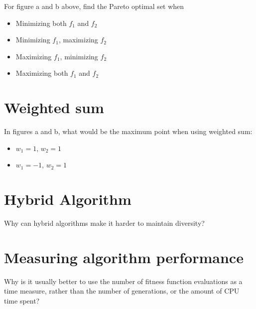 For figure a and b above, find the Pareto optimal set when
\begin{itemize}
    \item Minimizing both \(f_1\) and \(f_2\)
    \item Minimizing \(f_1\), maximizing \(f_2\)
    \item Maximizing \(f_1\), minimizing \(f_2\)
    \item Maximizing both \(f_1\) and \(f_2\)
\end{itemize}
\section{Weighted sum}
In figures a and b, what would be the maximum point when using weighted sum:
\begin{itemize}
    \item \(w_1 = 1\),  \(w_2 = 1\)
    \item \(w_1 = -1\), \(w_2 = 1\)
\end{itemize}
\section{Hybrid Algorithm}
Why can hybrid algorithms make it harder to maintain diversity?
\section{Measuring algorithm performance}
Why is it usually better to use the number of fitness function evaluations as a time measure,
rather than the number of generations, or the amount of CPU time spent?



